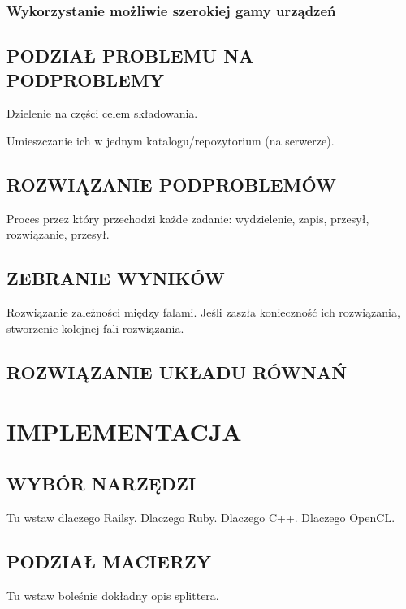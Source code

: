\documentclass[12pt,a4paper,twoside]{article}
\begin{document}
\subsubsection{Wykorzystanie możliwie szerokiej gamy urządzeń}

\subsection{PODZIAŁ PROBLEMU NA PODPROBLEMY}

Dzielenie na części celem składowania. 

Umieszczanie ich w jednym katalogu/repozytorium (na serwerze).

\subsection{ROZWIĄZANIE PODPROBLEMÓW}

Proces przez który przechodzi każde zadanie: wydzielenie, zapis, przesył, rozwiązanie, przesył.

\subsection{ZEBRANIE WYNIKÓW}

Rozwiązanie zależności między falami. Jeśli zaszła konieczność ich rozwiązania, stworzenie kolejnej fali rozwiązania.

\subsection{ROZWIĄZANIE UKŁADU RÓWNAŃ}

\section{IMPLEMENTACJA}

\subsection{WYBÓR NARZĘDZI}
\label{sec:tools}

Tu wstaw dlaczego Railsy. Dlaczego Ruby. Dlaczego C++. Dlaczego OpenCL.

\subsection{PODZIAŁ MACIERZY}

Tu wstaw boleśnie dokładny opis splittera.
\end{document}
